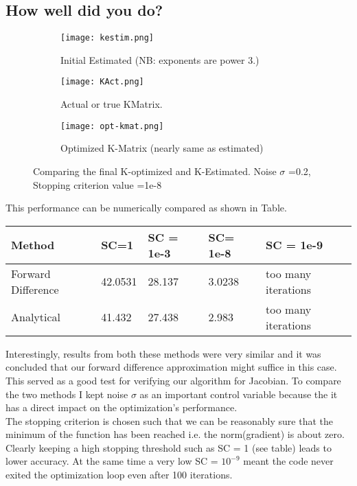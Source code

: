 \documentclass[titlepage]{article}
\begin{document}
\subsection{How well did you do?}
\begin{figure}[H]
\begin{subfigure}{0.3\textwidth}
\texttt{[image: kestim.png]}
\caption{Initial Estimated (NB: exponents are power 3.)}
\end{subfigure}
\begin{subfigure}{0.3\textwidth}
\texttt{[image: KAct.png]}
\caption{Actual or true KMatrix.}
\end{subfigure}
\begin{subfigure}{0.3\textwidth}
\texttt{[image: opt-kmat.png]}
\caption{Optimized K-Matrix (nearly same as estimated)}
\end{subfigure}
\caption{Comparing the final K-optimized and K-Estimated. Noise $\sigma$ =0.2, Stopping criterion value =1e-8 }
\end{figure}
This performance can be numerically compared as shown in Table.
\begin{center}
\begin{tabular}{ | m{2cm} | m{1cm}| m{1cm} | m{1cm} | m{1cm} } 
\hline
Method & SC=1 & SC = 1e-3 & SC= 1e-8 & SC = 1e-9 \\ 
\hline
Forward Difference & 42.0531 & 28.137 & 3.0238  & too many iterations \\ 
\hline
Analytical & 41.432 & 27.438 & 2.983 & too many iterations \\ 
\hline
\end{tabular}
\end{center}
Interestingly, results from both these methods were very similar and it was concluded that our forward difference approximation might suffice in this case. This served as a good test for verifying our algorithm for Jacobian. To compare the two methods I kept noise $\sigma$ as an important control variable because the it has a direct impact on the optimization's performance.\\
The stopping criterion is chosen such that we can be reasonably sure that the minimum of the function has been reached i.e. the norm(gradient) is about zero. Clearly keeping a high stopping threshold such as SC = 1 (see table) leads to lower accuracy. At the same time a very low SC = $10^{-9}$ meant the code never exited the optimization loop even after 100 iterations.\\
\end{document}
